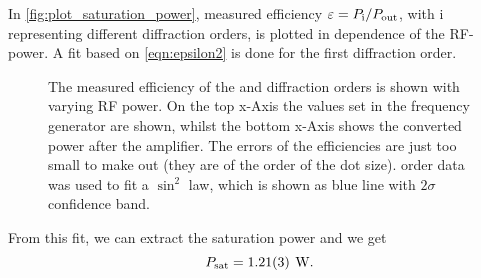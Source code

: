 In \autoref{fig:plot_saturation_power}, measured efficiency $\varepsilon = \P{i}/\P{out}$, with i representing different diffraction orders, is plotted in dependence of the RF-power. A fit based on \autoref{eqn:epsilon2} is done for the first diffraction order. 
\begin{figure}[H]
	\centering
	\caption{The measured efficiency of the  and  diffraction orders is shown with varying RF power. On the top x-Axis the values set in the frequency generator are shown, whilst the bottom x-Axis shows the converted power after the amplifier. The errors of the efficiencies are just too small to make out (they are of the order of the dot size).  order data was used to fit a $\sin^2$ law, which is shown as blue line with $2\sigma$ confidence band.} 
	\label{fig:plot_saturation_power}
\end{figure}

From this fit, we can extract the saturation power and we get 
$$\P{sat} = 1.21(3) \unit{W}.$$


